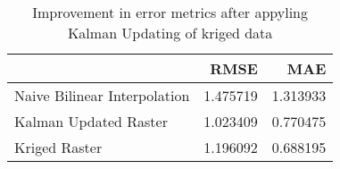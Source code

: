 \begin{table}
\caption{Improvement in error metrics after appyling Kalman Updating of kriged data}
\label{tab:Petten_lidar_error}
\begin{tabular}{lrr}
\toprule
 & RMSE & MAE \\
\midrule
Naive Bilinear Interpolation & 1.475719 & 1.313933 \\
Kalman Updated Raster & 1.023409 & 0.770475 \\
Kriged Raster & 1.196092 & 0.688195 \\
\bottomrule
\end{tabular}
\end{table}
